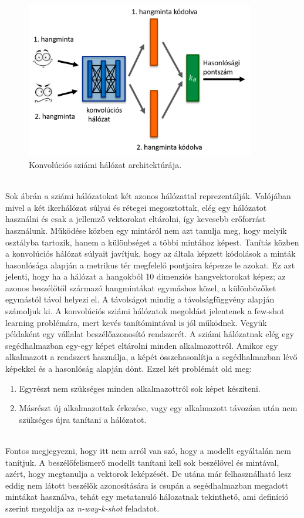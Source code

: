 \begin{figure}[!ht]
	\centering
	\includegraphics[width=100mm, keepaspectratio]{figures/siamese-cnn-arch.png}
	\caption{Konvolúciós sziámi hálózat architektúrája.}
	\label{fig:siamese-cnn-arch}
\end{figure}
\ \\
Sok ábrán a sziámi hálózatokat két azonos hálózattal reprezentálják. Valójában mivel a két ikerhálózat súlyai és rétegei megosztottak, elég egy hálózatot használni és csak a jellemző vektorokat eltárolni, így kevesebb erőforrást használunk.
\newline
\newline
Működése közben egy mintáról nem azt tanulja meg, hogy melyik osztályba tartozik, hanem a különbséget a többi mintához képest. Tanítás közben a konvolúciós hálózat súlyait javítjuk, hogy az általa képzett kódolások a minták hasonlósága alapján a metrikus tér megfelelő pontjaira képezze le azokat. Ez azt jelenti, hogy ha a hálózat a hangokból 10 dimenziós hangvektorokat képez; az azonos beszélőtől származó hangmintákat egymáshoz közel, a különbözőket egymástól távol helyezi el. A távolságot mindig a távolságfüggvény alapján számoljuk ki.
\newline
\newline
A konvolúciós sziámi hálózatok megoldást jelentenek a few-shot learning problémára, mert kevés tanítómintával is jól működnek. Vegyük példaként egy vállalat beszélőazonosító rendszerét. A sziámi hálózatnak elég egy segédhalmazban egy-egy képet eltárolni minden alkalmazottról. Amikor egy alkalmazott a rendszert használja, a képét összehasonlítja a segédhalmazban lévő képekkel és a hasonlóság alapján dönt. Ezzel két problémát old meg:

\begin{enumerate}
	\item Egyrészt nem szükséges minden alkalmazottról sok képet készíteni.
	\item Másrészt új alkalmazottak érkezése, vagy egy alkalmazott távozása után nem szükséges újra tanítani a hálózatot.
\end{enumerate}
\ \\
Fontos megjegyezni, hogy itt nem arról van szó, hogy a modellt egyáltalán nem tanítjuk. A beszélőfelismerő modellt tanítani kell sok beszélővel és mintával, azért, hogy megtanulja a vektorok leképzését. De utána már felhasználható lesz eddig nem látott beszélők azonosítására is csupán a segédhalmazban megadott mintákat használva, tehát egy metatanuló hálozatnak tekinthető, ami definíció szerint megoldja az \emph{n-way-k-shot} feladatot.

